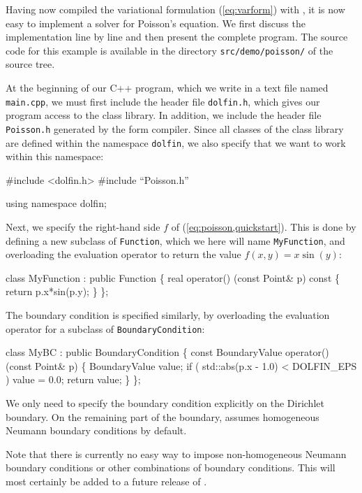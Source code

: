 Having now compiled the variational formulation (\ref{eq:varform})
with \ffc{}, it is now easy to implement a solver for Poisson's
equation. We first discuss the implementation line by line and then
present the complete program. The source code for this example is
available in the directory \texttt{src/demo/poisson/} of the \dolfin{}
source tree.

At the beginning of our C++ program, which we write in a text file
named \texttt{main.cpp}, we must first include the header file
\texttt{dolfin.h}, which gives our program access to the \dolfin{}
class library. In addition, we include the header file
\texttt{Poisson.h} generated by the form compiler. Since all classes
of the \dolfin{} class library are defined within the namespace
\texttt{dolfin}, we also specify that we want to work within this
namespace:
\begin{code}
  #include <dolfin.h>
  #include ``Poisson.h''
  
  using namespace dolfin;
\end{code}

Next, we specify the right-hand side $f$ of (\ref{eq:poisson,quickstart}).
This is done by defining a new subclass of \texttt{Function}, which we
here will name \texttt{MyFunction}, and overloading the evaluation
operator to return the value $f(x, y) = x \sin(y)$:
\begin{code}
  class MyFunction : public Function
  \{
    real operator() (const Point& p) const
    \{
      return p.x*sin(p.y);
    \}
  \};
\end{code}

The boundary condition is specified similarly, by overloading the
evaluation operator for a subclass of \texttt{BoundaryCondition}:
\begin{code}
  class MyBC : public BoundaryCondition
  \{
    const BoundaryValue operator() (const Point& p)
    \{
      BoundaryValue value;
      if ( std::abs(p.x - 1.0) < DOLFIN_EPS )
        value = 0.0;
      return value;
    \}
  \};
\end{code}
We only need to specify the boundary condition explicitly on the
Dirichlet boundary. On the remaining part of the boundary, \dolfin{}
assumes homogeneous Neumann boundary conditions by default.

Note that there is currently no easy way to impose non-homogeneous
Neumann boundary conditions or other combinations of boundary
conditions. This will most certainly be added to a future release of
\dolfin{}.

